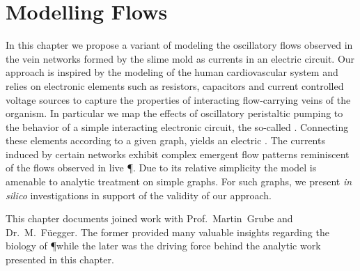 \chapter{Modelling Flows}\label{chap:model}

	In this chapter we propose a variant of modeling the oscillatory flows observed in the vein networks formed by the slime mold \Pp as currents in an electric circuit. Our approach is inspired by the modeling of the human cardiovascular system and relies on electronic elements such as resistors, capacitors and current controlled voltage sources to capture the properties of interacting flow-carrying veins of the organism. In particular we map the effects of oscillatory peristaltic pumping to the behavior of a simple interacting electronic circuit, the so-called \Pe. Connecting these elements according to a given graph, yields an electric \Pn. The currents induced by certain networks exhibit complex emergent flow patterns reminiscent of the flows observed in live \P. Due to its relative simplicity the model is amenable to analytic treatment on simple graphs. For such graphs, we present \emph{in silico} investigations in support of the validity of our approach.

	This chapter documents joined work with Prof.~Martin~Grube and Dr.~M.~F\"uegger. The former provided many valuable insights regarding the biology of \P while the later was the driving force behind the analytic work presented in this chapter.

	
	
	
	
	
	

